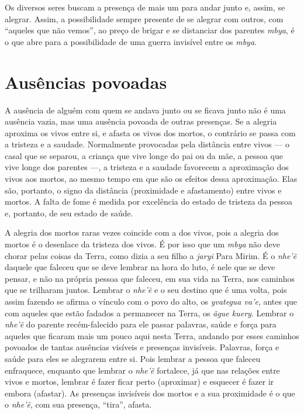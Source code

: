 Os diversos seres buscam a presença de mais um para andar junto e,
assim, se alegrar. Assim, a possibilidade sempre presente de se alegrar
com outros, com ``aqueles que não vemos'', ao preço de brigar e se
distanciar dos parentes \emph{mbya}, é o que abre para a possibilidade de uma
guerra invisível entre os \emph{mbya}. 

\section{Ausências povoadas}

A ausência de alguém com quem se andava junto ou se ficava junto não é
uma ausência vazia, mas uma ausência povoada de outras presenças. Se a
alegria aproxima os vivos entre si, e afasta os vivos dos mortos, o
contrário se passa com a tristeza e a saudade. Normalmente provocadas
pela distância entre vivos --- o casal que se separou, a criança que vive
longe do pai ou da mãe, a pessoa que vive longe dos parentes ---, a
tristeza e a saudade favorecem a aproximação dos vivos aos mortos, ao
mesmo tempo em que são os efeitos dessa aproximação. Elas são,
portanto, o signo da distância (proximidade e afastamento) entre vivos
e mortos. A falta de fome é medida por excelência do estado de tristeza
da pessoa e, portanto, de seu estado de saúde. 

A alegria dos mortos raras vezes coincide com a dos vivos, pois a
alegria dos mortos é o desenlace da tristeza dos vivos. É por isso que
um \emph{mbya} não deve chorar pelas coisas da Terra, como dizia a seu filho a
\emph{jaryi} Para Mirim. É o \emph{nhe’ẽ} daquele que faleceu que se deve
lembrar na hora do luto, é nele que se deve pensar, e não na própria
pessoa que faleceu, em sua vida na Terra, nos caminhos que se trilharam
juntos. Lembrar o \emph{nhe’ẽ} e o seu destino que é uma volta, pois
assim fazendo se afirma o vínculo com o povo do alto, os \emph{yvategua va’e},
antes que com aqueles que estão fadados a permanecer na Terra, os \emph{ãgue
kuery}. Lembrar o \emph{nhe’ẽ} do parente recém-falecido para ele passar
palavras, saúde e força para aqueles que ficaram mais um pouco aqui
nesta Terra, andando por esses caminhos povoados de tantas ausências
visíveis e presenças invisíveis. Palavras, força e saúde para eles se
alegrarem entre si. Pois lembrar a pessoa que faleceu enfraquece,
enquanto que lembrar o \emph{nhe’ẽ} fortalece, já que nas relações entre
vivos e mortos, lembrar é fazer ficar perto (aproximar) e esquecer é
fazer ir embora (afastar). As presenças invisíveis dos mortos e a sua
proximidade é o que o \emph{nhe’ẽ}, com sua presença, ``tira'', afasta.

